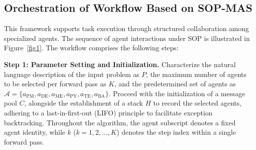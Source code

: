 \documentclass[preprint,12pt]{elsarticle}
\begin{document}
\subsection{Orchestration of Workflow Based on SOP-MAS}

This framework supports task execution through structured collaboration among specialized agents. The sequence of agent interactions under SOP is illustrated in Figure~\ref{fig1}.  The workflow comprises the following steps:

\medskip
\noindent\textbf{Step 1: Parameter Setting and Initialization.}
Characterize the natural language description of the input problem as $P$, the maximum number of agents to be selected per forward pass as $K$, and the predetermined set of agents as $\mathcal{A}=\{a_{\text{PM}}, a_{\text{DE}}, a_{\text{ME}}, a_{\text{PY}}, a_{\text{TE}}, a_{\text{BA}}\}$. Proceed with the initialization of a message pool $C$, alongside the establishment of a stack $H$ to record the selected agents, adhering to a last-in-first-out (LIFO) principle to facilitate exception backtracking. Throughout the algorithm, the agent subscript denotes a fixed agent identity, while $k$ ($k = 1, 2, \ldots, K$) denotes the step index within a single forward pass.
\end{document}
